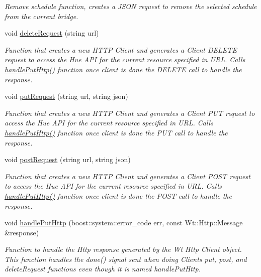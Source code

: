 \begin{DoxyCompactItemize}
\begin{DoxyCompactList}\small\item\em Remove schedule function, creates a J\+S\+ON request to remove the selected schedule from the current bridge. \end{DoxyCompactList}\item 
void \hyperlink{classLightManagementWidget_a0cddaa88f0ec438a61a421d059935048}{delete\+Request} (string url)
\begin{DoxyCompactList}\small\item\em Function that creates a new H\+T\+TP Client and generates a Client D\+E\+L\+E\+TE request to access the Hue A\+PI for the current resource specified in U\+RL. Calls \hyperlink{classLightManagementWidget_a09f20b24e34de1ede968a73e7118913e}{handle\+Put\+Http()} function once client is done the D\+E\+L\+E\+TE call to handle the response. \end{DoxyCompactList}\item 
void \hyperlink{classLightManagementWidget_a13603b45a36df6fc5ffab68bc1791f6f}{put\+Request} (string url, string json)
\begin{DoxyCompactList}\small\item\em Function that creates a new H\+T\+TP Client and generates a Client P\+UT request to access the Hue A\+PI for the current resource specified in U\+RL. Calls \hyperlink{classLightManagementWidget_a09f20b24e34de1ede968a73e7118913e}{handle\+Put\+Http()} function once client is done the P\+UT call to handle the response. \end{DoxyCompactList}\item 
void \hyperlink{classLightManagementWidget_a2d83bd768b2afc25eaade1ca8d64d878}{post\+Request} (string url, string json)
\begin{DoxyCompactList}\small\item\em Function that creates a new H\+T\+TP Client and generates a Client P\+O\+ST request to access the Hue A\+PI for the current resource specified in U\+RL. Calls \hyperlink{classLightManagementWidget_a09f20b24e34de1ede968a73e7118913e}{handle\+Put\+Http()} function once client is done the P\+O\+ST call to handle the response. \end{DoxyCompactList}\item 
void \hyperlink{classLightManagementWidget_a09f20b24e34de1ede968a73e7118913e}{handle\+Put\+Http} (boost\+::system\+::error\+\_\+code err, const Wt\+::\+Http\+::\+Message \&response)
\begin{DoxyCompactList}\small\item\em Function to handle the Http response generated by the Wt Http Client object. This function handles the done() signal sent when doing Client\textquotesingle{}s put, post, and delete\+Request functions even though it is named handle\+Put\+Http. \end{DoxyCompactList}\item 

\end{DoxyCompactItemize}
